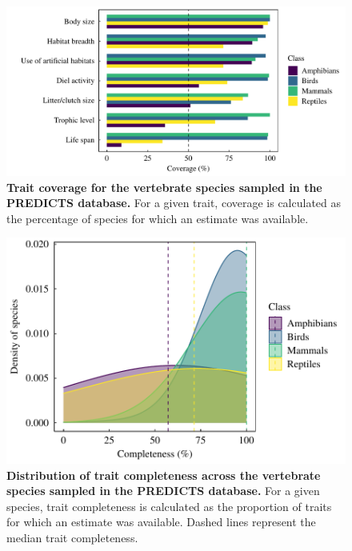 \begin{figure}[h!]
\centering
\includegraphics[scale=0.8]{Supporting/Chapter3/Figures/SI_coverage}
\caption[Trait coverage for the vertebrate species sampled in the PREDICTS database]{\textbf{Trait coverage for the vertebrate species sampled in the PREDICTS database.} For a given trait, coverage is calculated as the percentage of species for which an estimate was available.}
\label{SI3_F4}
\end{figure}

\begin{figure}[h!]
\centering
\includegraphics[scale=0.8]{Supporting/Chapter3/Figures/SI_completeness}
\caption[Distribution of trait completeness across the vertebrate species sampled in the PREDICTS database]{\textbf{Distribution of trait completeness across the vertebrate species sampled in the PREDICTS database.} For a given species, trait completeness is calculated as the proportion of traits for which an estimate was available. Dashed lines represent the median trait completeness.}
\label{SI3_F5}
\end{figure}


